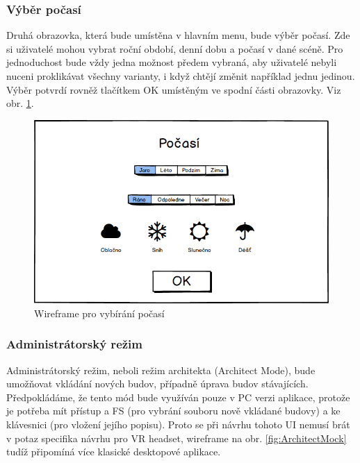 \documentclass[thesis=B,czech]{FITthesis}[2012/06/26]
\begin{document}
	\subsubsection{Výběr počasí}
Druhá obrazovka, která bude umístěna v hlavním menu, bude výběr počasí. Zde si uživatelé mohou vybrat roční období, denní dobu a počasí v dané scéně. Pro jednoduchost bude vždy jedna možnost předem vybraná, aby uživatelé nebyli nuceni proklikávat všechny varianty, i když chtějí změnit například jednu jedinou. Výběr potvrdí rovněž tlačítkem OK umístěným ve spodní části obrazovky. Viz obr. \ref{fig:mockPocasi}.
	
	\begin{figure}
  		\includegraphics[width=\textwidth,height=\textheight,keepaspectratio]{MockPocasi.png}
  		\caption{Wireframe pro vybírání počasí}
  		\label{fig:mockPocasi}
	\end{figure}
	
	\subsubsection{Administrátorský režim}
Administrátorský režim, neboli režim architekta (Architect Mode), bude umožňovat vkládání nových budov, případně úprava budov stávajících. Předpokládáme, že tento mód bude využíván pouze v PC verzi aplikace, protože je potřeba mít přístup a FS (pro vybrání souboru nově vkládané budovy) a ke klávesnici (pro vložení jejího popisu). Proto se při návrhu tohoto UI nemusí brát v potaz specifika návrhu pro VR headset, wireframe na obr. \ref{fig:ArchitectMock} tudíž připomíná více klasické desktopové aplikace.
\end{document}
